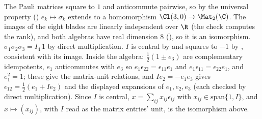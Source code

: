 The Pauli matrices square to $1$ and anticommute pairwise, so by the universal property () $e_k \mapsto \sigma_k$ extends to a homomorphism $\Cl(3,0) \to \Mat_2(\C)$. The images of the eight blades are linearly independent over $\R$ (the check computes the rank), and both algebras have real dimension $8$ (), so it is an isomorphism. $\sigma_1 \sigma_2 \sigma_3 = I_4\,1$ by direct multiplication. $I$ is central by  and squares to $-1$ by , consistent with its image. Inside the algebra: $\tfrac12(1 \pm e_3)$ are complementary idempotents, $e_1$ anticommutes with $e_3$ so $e_1\epsilon_{22} = \epsilon_{11}e_1$ and $e_1\epsilon_{11} = \epsilon_{22}e_1$, and $e_1^{2} = 1$; these give the matrix-unit relations, and $Ie_2 = -e_1e_3$ gives $\epsilon_{12} = \tfrac12(e_1 + Ie_2)$ and the displayed expansions of $e_1, e_2, e_3$ (each checked by direct multiplication). Since $I$ is central, $x = \sum_{ij} x_{ij}\epsilon_{ij}$ with $x_{ij} \in \mathrm{span}\{1, I\}$, and $x \mapsto (x_{ij})$, with $I$ read as the matrix entries' unit, is the isomorphism above.
